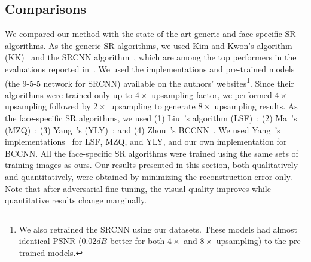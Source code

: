 \documentclass[runningheads]{llncs}
\begin{document}
\subsection{Comparisons}

We compared our method with the state-of-the-art generic and face-specific SR algorithms. As the generic SR algorithms, we used Kim and Kwon's algorithm (KK)~\cite{Kim10PAMI} and the SRCNN algorithm~\cite{Dong15PAMI}, which are among the top performers in the evaluations reported in~\cite{Yang14ECCV,Dong15PAMI}. We used the implementations and pre-trained models (the 9-5-5 network for SRCNN) available on the authors' websites\footnote{We also retrained the SRCNN using our datasets. These models had almost identical PSNR ($0.02dB$ better for both $4 \times$ and $8 \times$ upsampling) to the pre-trained models.}. Since their algorithms were trained only up to $4\times$ upsampling factor, we performed $4\times$ upsampling followed by $2\times$ upsampling to generate $8\times$ upsampling results. As the face-specific SR algorithms, we used (1) Liu~\etal's algorithm (LSF)~\cite{Liu07}; (2) Ma~\etal's (MZQ)~\cite{Ma10PR}; (3) Yang~\etal's (YLY)~\cite{Yang13CVPR}; and (4) Zhou~\etal's BCCNN~\cite{Zhou15AAAI}. We used Yang~\etal's implementations~\cite{Yang13CVPR} for LSF, MZQ, and YLY, and our own implementation for BCCNN. %
All the face-specific SR algorithms were trained using the same sets of training images as ours.
Our results presented in this section, both qualitatively and quantitatively, were obtained by minimizing the reconstruction error only. Note that after adversarial fine-tuning, the visual quality improves while quantitative results change marginally.
\end{document}
